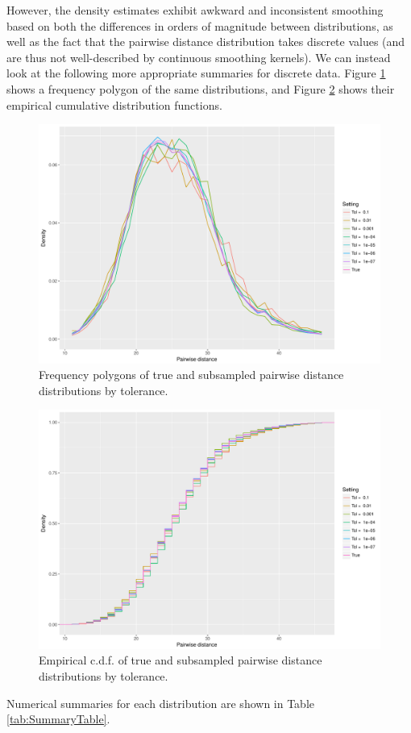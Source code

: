 \documentclass{article}
\begin{document}
However, the density estimates exhibit awkward and inconsistent smoothing based on both the differences in orders of magnitude between distributions, as well as the fact that the pairwise distance distribution takes discrete values (and are thus not well-described by continuous smoothing kernels).
We can instead look at the following more appropriate summaries for discrete data.
Figure \ref{fig:FreqPoly} shows a frequency polygon of the same distributions, and Figure \ref{fig:ECDF} shows their empirical cumulative distribution functions.
\begin{figure}
    \includegraphics[width=\linewidth]{Figures/PairwiseDistance/freqpoly_by_tol.pdf}
    \caption{Frequency polygons of true and subsampled pairwise distance distributions by tolerance.}
    \label{fig:FreqPoly}
\end{figure}
\begin{figure}
    \includegraphics[width=\linewidth]{Figures/PairwiseDistance/ecdf_by_tol.pdf}
    \caption{Empirical c.d.f. of true and subsampled pairwise distance distributions by tolerance.}
    \label{fig:ECDF}
\end{figure}

Numerical summaries for each distribution are shown in Table \ref{tab:SummaryTable}.
\end{document}
